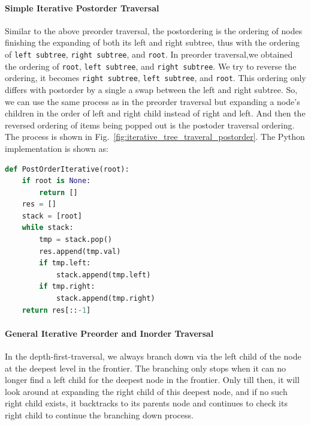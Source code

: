 \documentclass[../main.tex]{subfiles}
\begin{document}
\paragraph{Simple Iterative Postorder Traversal} Similar to the above preorder traversal, the postordering is the ordering of nodes finishing the expanding of both its left and right subtree, thus with the ordering of  \texttt{left subtree}, \texttt{right subtree}, and \texttt{root}.   In preorder traversal,we obtained the ordering of  \texttt{root}, \texttt{left subtree}, and \texttt{right subtree}.  We try to reverse the ordering, it becomes \texttt{right subtree}, \texttt{left subtree}, and \texttt{root}.  This ordering only differs with postorder by a single a swap between the left and right subtree. So, we can use the same process as in the preorder traversal but expanding a node's children in the order of left and right child instead of right and left. And then the reversed ordering of items being popped out is the postoder traversal ordering. The process is shown in Fig.~\ref{fig:iterative_tree_traveral_postorder}. The Python implementation is shown as:
\begin{lstlisting}[language=Python]
def PostOrderIterative(root):
    if root is None:
        return []
    res = []
    stack = [root]
    while stack:
        tmp = stack.pop()
        res.append(tmp.val)
        if tmp.left:
            stack.append(tmp.left)
        if tmp.right:
            stack.append(tmp.right)
    return res[::-1]
\end{lstlisting}

\paragraph{General Iterative Preorder and Inorder Traversal } In the depth-first-traversal, we always branch down via the left child of the node at the deepest level in the frontier. The branching only stops when it can no longer find a left child for the deepest node in the frontier. Only till then, it will look around at expanding the right child of this deepest node, and if no such right child exists, it backtracks to its parents node and continues to check its right child to continue the branching down process. 
\end{document}
